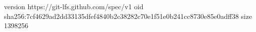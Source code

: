 version https://git-lfs.github.com/spec/v1
oid sha256:7cf4629ad2dd33135dfef4840b2c38282c70e1f51e0b241cc8730e85e0adff38
size 1398256
